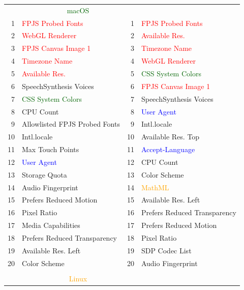 \begin{table}[H]
\scriptsize
\centering
\begin{tabular}{r l | r l}
\Xhline{2\arrayrulewidth}
\multicolumn{2}{c|}{\textsf{\textcolor{red}{Windows}}} & \multicolumn{2}{c}{\textsf{\textcolor{darkgreen}{macOS}}} \\
\Xhline{2\arrayrulewidth}
1 & \textcolor{red}{FPJS Probed Fonts} & 1 & \textcolor{red}{FPJS Probed Fonts} \\
2 & \textcolor{red}{WebGL Renderer} & 2 & \textcolor{red}{Available Res.} \\
3 & \textcolor{red}{FPJS Canvas Image 1} & 3 & \textcolor{red}{Timezone Name} \\
4 & \textcolor{red}{Timezone Name} & 4 & \textcolor{red}{WebGL Renderer} \\
5 & \textcolor{red}{Available Res.} & 5 & \textcolor{darkgreen}{CSS System Colors} \\
6 & SpeechSynthesis Voices & 6 & \textcolor{red}{FPJS Canvas Image 1} \\
7 & \textcolor{darkgreen}{CSS System Colors} & 7 & SpeechSynthesis Voices \\
8 & CPU Count & 8 & \textcolor{blue}{User Agent} \\
9 & Allowlisted FPJS Probed Fonts & 9 & Intl.locale \\
10 & Intl.locale & 10 & Available Res. Top \\
11 & Max Touch Points & 11 & \textcolor{blue}{Accept-Language} \\
12 & \textcolor{blue}{User Agent} & 12 & CPU Count \\
13 & Storage Quota & 13 & Color Scheme \\
14 & Audio Fingerprint & 14 & \textcolor{orange}{MathML} \\
15 & Prefers Reduced Motion & 15 & Available Res. Left \\
16 & Pixel Ratio & 16 & Prefers Reduced Transparency \\
17 & Media Capabilities & 17 & Prefers Reduced Motion \\
18 & Prefers Reduced Transparency & 18 & Pixel Ratio \\
19 & Available Res. Left & 19 & SDP Codec List \\
20 & Color Scheme & 20 & Audio Fingerprint \\
\Xhline{2\arrayrulewidth}
 & & & \\
\Xhline{2\arrayrulewidth}
\multicolumn{2}{c|}{\textsf{\textcolor{blue}{Android}}} & \multicolumn{2}{c}{\textsf{\textcolor{orange}{Linux}}} \\

\end{tabular}
\end{table}
